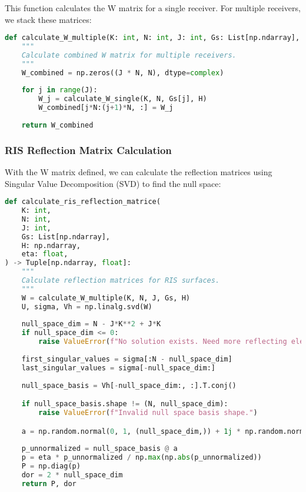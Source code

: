 This function calculates the W matrix for a single receiver. For multiple receivers, we stack these matrices:

\begin{lstlisting}[language=python, caption={W matrix for multiple receivers}]
def calculate_W_multiple(K: int, N: int, J: int, Gs: List[np.ndarray], H: np.ndarray) -> np.ndarray:
    """
    Calculate combined W matrix for multiple receivers.
    """
    W_combined = np.zeros((J * N, N), dtype=complex)
    
    for j in range(J):
        W_j = calculate_W_single(K, N, Gs[j], H)
        W_combined[j*N:(j+1)*N, :] = W_j
    
    return W_combined
\end{lstlisting}

\subsubsection{RIS Reflection Matrix Calculation}

With the W matrix defined, we can calculate the reflection matrices using Singular Value Decomposition (SVD) to find the null space:

\begin{lstlisting}[language=python, caption={RIS Reflection Matrix Calculation}]
def calculate_ris_reflection_matrice(
    K: int, 
    N: int, 
    J: int, 
    Gs: List[np.ndarray], 
    H: np.ndarray, 
    eta: float,
) -> Tuple[np.ndarray, float]:
    """
    Calculate reflection matrices for RIS surfaces.
    """
    W = calculate_W_multiple(K, N, J, Gs, H)
    U, sigma, Vh = np.linalg.svd(W)
    
    null_space_dim = N - J*K**2 + J*K
    if null_space_dim <= 0:
        raise ValueError(f"No solution exists. Need more reflecting elements.")
    
    first_singular_values = sigma[:N - null_space_dim]
    last_singular_values = sigma[-null_space_dim:]
    
    null_space_basis = Vh[-null_space_dim:, :].T.conj()

    if null_space_basis.shape != (N, null_space_dim):
        raise ValueError(f"Invalid null space basis shape.")

    a = np.random.normal(0, 1, (null_space_dim,)) + 1j * np.random.normal(0, 1, (null_space_dim,))
    
    p_unnormalized = null_space_basis @ a
    p = eta * p_unnormalized / np.max(np.abs(p_unnormalized))
    P = np.diag(p)
    dor = 2 * null_space_dim
    return P, dor
\end{lstlisting}

